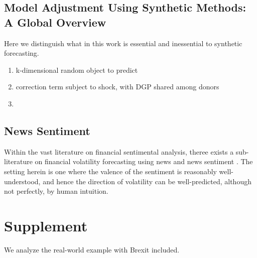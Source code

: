 \documentclass[11pt]{article}
\theoremstyle{definition}
\begin{document}
\subsection{Model Adjustment Using Synthetic Methods: A Global Overview}
Here we distinguish what in this work is essential and inessential to synthetic forecasting.

\begin{enumerate}
  \item k-dimensional random object to predict
  \item correction term subject to shock, with DGP shared among donors
  \item 
\end{enumerate}

\subsection{News Sentiment}
Within the vast literature on financial sentimental analysis, theree exists a sub-literature on financial volatility forecasting using news and news sentiment \citep{atkins2018financial}.  The setting herein is one where the valence of the sentiment is reasonably well-understood, and hence the direction of volatility can be well-predicted, although not perfectly, by human intuition.
\section{Supplement}
We analyze the real-world example with Brexit included.

\clearpage



 
\end{document}
